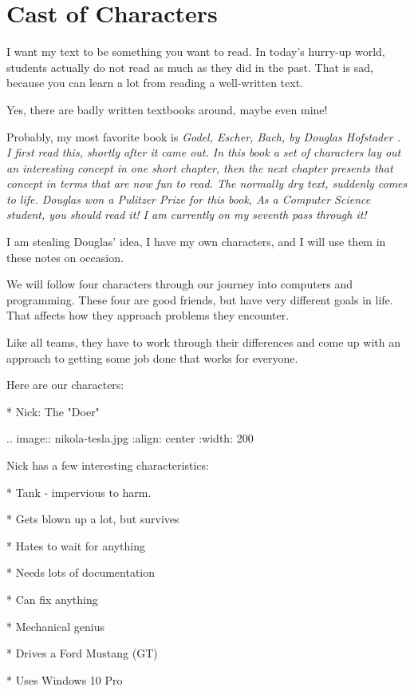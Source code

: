 \chapter{Cast of Characters}

I want my text to be something you want to read. In today's hurry-up
world, students actually do not read as much as they did in the past. That is
sad, because you can learn a lot from reading a well-written text.

Yes, there are badly written textbooks around, maybe even mine!

Probably, my most favorite book is \it{Godel, Escher, Bach}, by Douglas Hofstader
\cite{Hofstadter:1999}. I first read this, shortly after it came out. In this
book a set of characters lay out an interesting concept in one short chapter,
then the next chapter presents that concept in terms that are now fun to read.
The normally dry text, suddenly comes to life. Douglas won a Pulitzer Prize for
this book, As a Computer Science student, you should read it! I am currently on
my seventh pass through it!

I am stealing Douglas' idea, I have my own characters, and I will use them in
these notes on occasion.

We will follow four characters through our journey into computers and
programming. These four are good friends, but have very different goals in
life. That affects how they approach problems they encounter.

Like all teams, they have to work through their differences and come up with an
approach to getting some job done that works for everyone.

Here are our characters:

* Nick:   The "Doer"

..  image:: nikola-tesla.jpg
    :align: center
    :width: 200

Nick has a few interesting characteristics:

    * Tank - impervious to harm. 

    * Gets blown up a lot, but survives
    
    * Hates to wait for anything
    
    * Needs lots of documentation
    
    * Can fix anything
    
    * Mechanical genius

    * Drives a Ford Mustang (GT)

    * Uses Windows 10 Pro

